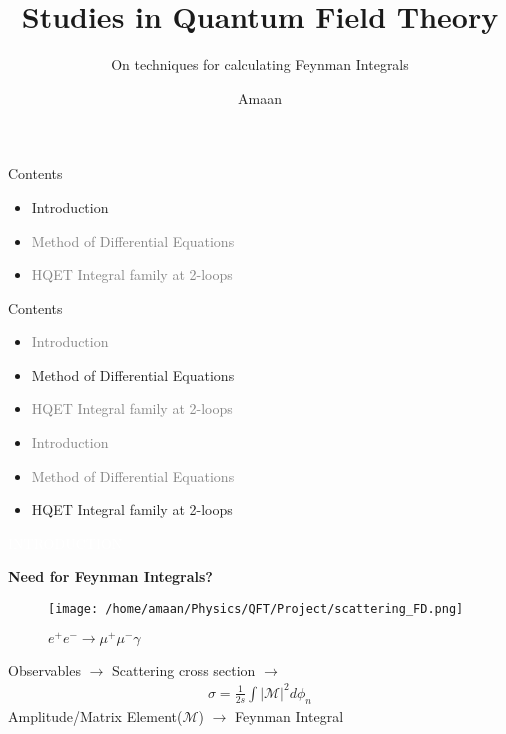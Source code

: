 \documentclass[11pt]{beamer}
\begin{document}
	\author{Amaan}
	\title{Studies in Quantum Field Theory }
	\subtitle{On techniques for calculating Feynman Integrals}
	
	\begin{frame}[plain]
		\maketitle
	\end{frame}
\begin{frame}{Contents}
	\begin{itemize}
		\item Introduction 
		\item \textcolor{gray}{Method of Differential Equations}
		\item \textcolor{gray}{HQET Integral family at 2-loops}
	\end{itemize}
\end{frame}
\begin{frame}{Contents}
	\begin{itemize}
		\item \textcolor{gray}{Introduction} 
		\item Method of Differential Equations
		\item \textcolor{gray}{HQET Integral family at 2-loops}
	\end{itemize}
\end{frame}
\begin{frame}
	\begin{itemize}
		\item \textcolor{gray}{Introduction} 
		\item \textcolor{gray}{Method of Differential Equations}
		\item HQET Integral family at 2-loops
	\end{itemize}
\end{frame}
{
	\begin{frame}
		\begin{center}
			\textcolor{white}{INTRODUCTION}
		\end{center}
	\end{frame}
}
\begin{frame}
	\textbf{Need for Feynman Integrals?}
		\begin{figure}
		\centering
		\texttt{[image: /home/amaan/Physics/QFT/Project/scattering\_FD.png]}
		\caption{ $e^+e^- \rightarrow \mu^+\mu^-\gamma$}
		\label{fig:enter-label}
	\end{figure}
Observables $\rightarrow$ Scattering cross section $\rightarrow$
\begin{align}
	\sigma=\frac{1}{2s}\int|\mathcal{M}|^2 d\phi_n
\end{align}
Amplitude/Matrix Element($\mathcal{M}$)  $\rightarrow$ Feynman Integral
\end{frame}
\end{document}
